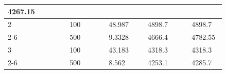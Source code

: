 \documentclass[UTF8,10pt,a4paper,fontset=fandol]{ctexart}
\newcommand{\fieldvalue}[1]{#1}
\newcommand{\handwritten}[1]{#1}
\begin{document}
\begin{center}
\begin{tabular}{|p{0.12\linewidth}|p{0.10\linewidth}|p{0.16\linewidth}|p{0.16\linewidth}|p{0.18\linewidth}|p{0.12\linewidth}|}
\fieldvalue{\handwritten{4267.15}}
\\ \hline
2 &
&
\fieldvalue{\handwritten{100}}
&
\fieldvalue{\handwritten{48.987}}
&
\fieldvalue{\handwritten{4898.7}}
&
\fieldvalue{\handwritten{4898.7}}
\\ \cline{2-6}
&
&
\fieldvalue{\handwritten{500}}
&
\fieldvalue{\handwritten{9.3328}}
&
\fieldvalue{\handwritten{4666.4}}
&
\fieldvalue{\handwritten{4782.55}}
\\ \hline
3 &
&
\fieldvalue{\handwritten{100}}
&
\fieldvalue{\handwritten{43.183}}
&
\fieldvalue{\handwritten{4318.3}}
&
\fieldvalue{\handwritten{4318.3}}
\\ \cline{2-6}
&
&
\fieldvalue{\handwritten{500}}
&
\fieldvalue{\handwritten{8.562}}
&
\fieldvalue{\handwritten{4253.1}}
&
\fieldvalue{\handwritten{4285.7}}
\\ \hline
\end{tabular}
\end{center}
\end{document}
